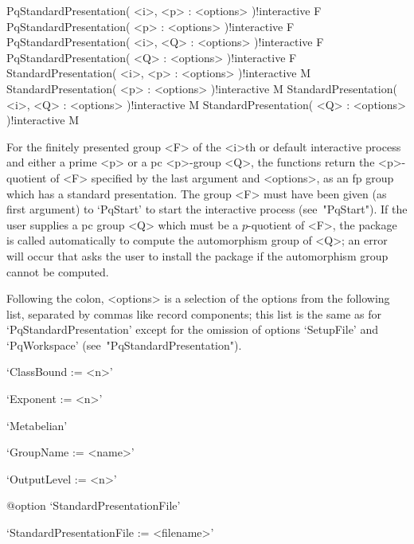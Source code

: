 \>PqStandardPresentation( <i>, <p> : <options> )!{interactive} F
\>PqStandardPresentation( <p> : <options> )!{interactive} F
\>PqStandardPresentation( <i>, <Q> : <options> )!{interactive} F
\>PqStandardPresentation( <Q> : <options> )!{interactive} F
\>StandardPresentation( <i>, <p> : <options> )!{interactive} M
\>StandardPresentation( <p> : <options> )!{interactive} M
\>StandardPresentation( <i>, <Q> : <options> )!{interactive} M
\>StandardPresentation( <Q> : <options> )!{interactive} M

For the finitely presented group <F> of the <i>th or default  interactive
{\ANUPQ} process and either a prime  <p>  or  a  pc  <p>-group  <Q>,  the
functions return the <p>-quotient of <F> specified by the  last  argument
and <options>, as an fp group which  has  a  standard  presentation.  The
group <F> must have been given (as first argument) to `PqStart' to  start
the interactive {\ANUPQ} process (see~"PqStart"). If the user supplies  a
pc group <Q> which must be a $p$-quotient of <F>, the package  {\AutPGrp}
is called automatically to compute the  automorphism  group  of  <Q>;  an
error will occur that asks the user to install the package {\AutPGrp}  if
the automorphism group cannot be computed.

Following the colon, <options> is a selection of  the  options  from  the
following list, separated by commas like record components; this list  is
the same as for  `PqStandardPresentation'  except  for  the  omission  of
options `SetupFile' and `PqWorkspace' (see~"PqStandardPresentation").

\beginlist

\item{}`ClassBound := <n>'

\item{}`Exponent := <n>'

\item{}`Metabelian'

\item{}`GroupName := <name>'

\item{}`OutputLevel := <n>'

%
{@option \noexpand`StandardPresentationFile'}
\item{}`StandardPresentationFile := <filename>'

